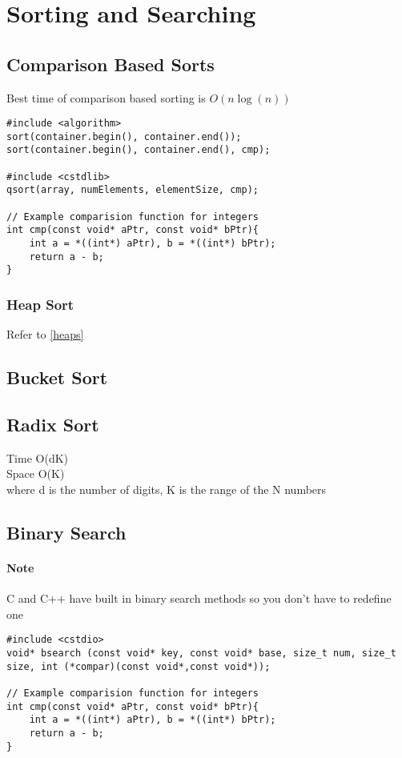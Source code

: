 \section{Sorting and Searching}

\subsection{Comparison Based Sorts}
Best time of comparison based sorting is  $O(n \log(n))$
\begin{lstlisting}[style=CStyle]
#include <algorithm>
sort(container.begin(), container.end());
sort(container.begin(), container.end(), cmp);

#include <cstdlib>
qsort(array, numElements, elementSize, cmp);

// Example comparision function for integers
int cmp(const void* aPtr, const void* bPtr){
	int a = *((int*) aPtr), b = *((int*) bPtr);
	return a - b;
}
\end{lstlisting}

\subsubsection{Heap Sort}
Refer to \ref{heaps} 

\subsection{Bucket Sort}


\subsection{Radix Sort}
Time O(dK) \\
Space O(K) \\
where d is the number of digits, K is the range of the N numbers \\

\subsection{Binary Search}


\paragraph{Note}
\noindent C and C++ have built in binary search methods so you don't have to redefine one

\begin{lstlisting}[style=CStyle]
#include <cstdio>
void* bsearch (const void* key, const void* base, size_t num, size_t size, int (*compar)(const void*,const void*));

// Example comparision function for integers
int cmp(const void* aPtr, const void* bPtr){
	int a = *((int*) aPtr), b = *((int*) bPtr);
	return a - b;
}
\end{lstlisting}

